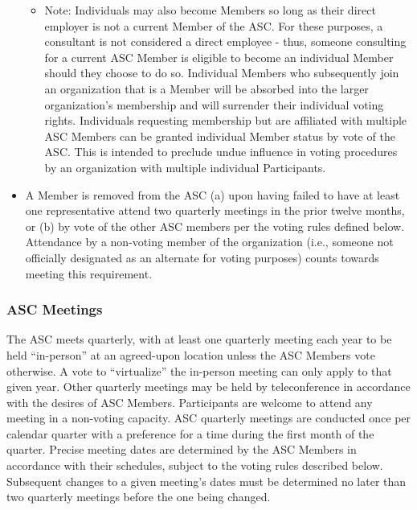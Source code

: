 \documentclass{article}
\providecommand{\tightlist}{%
  \setlength{\itemsep}{0pt}\setlength{\parskip}{0pt}}
\begin{document}
\begin{itemize}
  \begin{itemize}
  \tightlist
  \item
    Note: Individuals may also become Members so long as their direct
    employer is not a current Member of the ASC. For these purposes, a
    consultant is not considered a direct employee - thus, someone
    consulting for a current ASC Member is eligible to become an
    individual Member should they choose to do so. Individual Members
    who subsequently join an organization that is a Member will be
    absorbed into the larger organization's membership and will
    surrender their individual voting rights. Individuals requesting
    membership but are affiliated with multiple ASC Members can be
    granted individual Member status by vote of the ASC. This is
    intended to preclude undue influence in voting procedures by an
    organization with multiple individual Participants.
  \end{itemize}
\item
  A Member is removed from the ASC (a) upon having failed to have at
  least one representative attend two quarterly meetings in the prior
  twelve months, or (b) by vote of the other ASC members per the voting
  rules defined below. Attendance by a non-voting member of the
  organization (i.e., someone not officially designated as an alternate
  for voting purposes) counts towards meeting this requirement.
\end{itemize}

\subsubsection{ASC Meetings}

The ASC meets quarterly, with at least one quarterly meeting each year
to be held ``in-person'' at an agreed-upon location unless the ASC
Members vote otherwise. A vote to ``virtualize'' the in-person meeting
can only apply to that given year. Other quarterly meetings may be held
by teleconference in accordance with the desires of ASC Members.
Participants are welcome to attend any meeting in a non-voting capacity.
ASC quarterly meetings are conducted once per calendar quarter with a
preference for a time during the first month of the quarter. Precise
meeting dates are determined by the ASC Members in accordance with their
schedules, subject to the voting rules described below. Subsequent
changes to a given meeting's dates must be determined no later than two
quarterly meetings before the one being changed.
\end{document}
